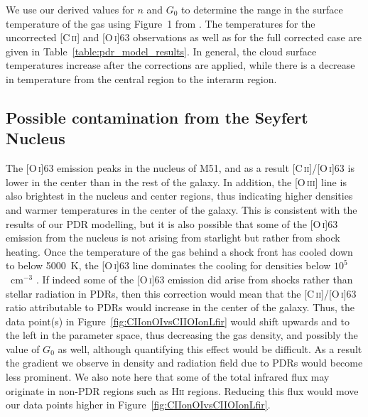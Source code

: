 \documentclass[preprint2]{aastex}
\begin{document}
We use our derived values for $n$ and $G_{0}$ to determine the range in the surface temperature of the gas using Figure~1 from \citet{1999ApJ...527..795K}.  The temperatures for the uncorrected [C\,\textsc{ii}] and [O\,\textsc{i}]63 observations as well as for the full corrected case are given in Table~\ref{table:pdr_model_results}.  In general, the cloud surface temperatures increase after the corrections are applied, while there is a decrease in temperature from the central region to the interarm region.

\subsection{Possible contamination from the Seyfert Nucleus}\label{seyfert_influence}
The [O\,\textsc{i}]63 emission peaks in the nucleus of M51, and as a result [C\,\textsc{ii}]/[O\,\textsc{i}]63 is lower in the center than in the rest of the galaxy.  In addition, the [O\,\textsc{iii}] line is also brightest in the nucleus and center regions, thus indicating higher densities and warmer temperatures in the center of the galaxy.  This is consistent with the results of our PDR modelling, but it is also possible that some of the [O\,\textsc{i}]63 emission from the nucleus is not arising from starlight but rather from shock heating.  Once the temperature of the gas behind a shock front has cooled down to below 5000~K, the [O\,\textsc{i}]63 line dominates the cooling for densities below $10^{5}$~cm$^{-3}$ \citep{1989ApJ...342..306H}.  If indeed some of the [O\,\textsc{i}]63 emission did arise from shocks rather than stellar radiation in PDRs, then this correction would mean that the [C\,\textsc{ii}]/[O\,\textsc{i}]63 ratio attributable to PDRs would increase in the center of the galaxy. Thus, the data point(s) in Figure~\ref{fig:CIIonOIvsCIIOIonLfir} would shift upwards and to the left in the parameter space, thus decreasing the gas density, and possibly the value of $G_{0}$ as well, although quantifying this effect would be difficult.  As a result the gradient we observe in density and radiation field due to PDRs would become less prominent.  We also note here that some of the total infrared flux may originate in non-PDR regions such as H\textsc{ii} regions.  Reducing this flux would move our data points higher in Figure~\ref{fig:CIIonOIvsCIIOIonLfir}.
\end{document}
